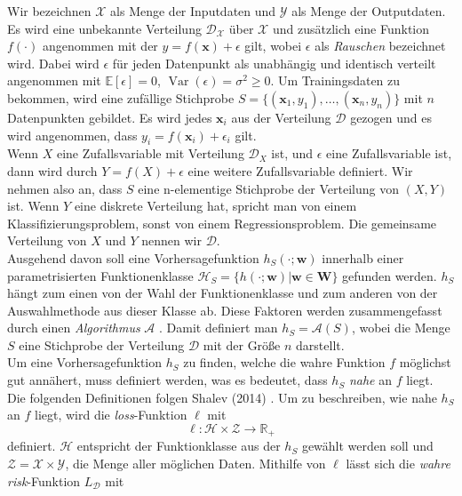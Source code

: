 Wir bezeichnen $\mathcal{X}$ als Menge der Inputdaten und $\mathcal{Y}$ als Menge der Outputdaten. Es wird eine unbekannte Verteilung $\mathcal{D_X}$ \"uber 
$\mathcal{X}$ und zus\"atzlich eine Funktion $f(\cdot)$ angenommen mit der $y = f(\mathbf{x}) + \epsilon$ gilt, wobei $\epsilon$ als \textit{Rauschen} bezeichnet wird. 
Dabei wird $\epsilon$ f\"ur jeden Datenpunkt als unabh\"angig und identisch verteilt angenommen mit
$\mathbb{E}[\epsilon] = 0$, $\operatorname{Var}(\epsilon) = \sigma^2 \geq 0$.
Um Trainingsdaten zu bekommen, wird eine zuf\"allige Stichprobe $S = \{(\mathbf{x}_1, y_1), \dots ,
(\mathbf{x}_n, y_n)\}$ mit $n$ Datenpunkten gebildet. Es wird jedes $\mathbf{x}_i$ aus der Verteilung $\mathcal{D}$ gezogen und es wird 
angenommen, dass $y_i = f(\mathbf{x}_i) + \epsilon_i $ gilt. \\


Wenn $X$ eine Zufallsvariable mit Verteilung $\mathcal{D}_X$ ist, und $\epsilon$ eine Zufallsvariable ist, dann wird durch 
$Y = f(X) + \epsilon$ eine weitere Zufallsvariable definiert. Wir nehmen also an, dass $S$ eine n-elementige Stichprobe der Verteilung
von $(X,Y)$ ist. Wenn $Y$ eine diskrete Verteilung hat, spricht man von einem Klassifizierungsproblem, sonst von einem Regressionsproblem.
Die gemeinsame Verteilung von $X$ und $Y$ nennen wir $\mathcal{D}$.\\

Ausgehend davon soll eine Vorhersagefunktion $h_S(\cdot;\mathbf{w})$ innerhalb einer parametrisierten Funktionenklasse $\mathcal{H}_S = \{ h(\cdot; \mathbf{w})
|\mathbf{w} \in \mathbf{W}\}$ gefunden werden. $h_S$ h\"angt zum einen von der Wahl der Funktionenklasse und zum anderen von der Auswahlmethode aus dieser Klasse ab. 
Diese Faktoren werden zusammengefasst durch einen \textit{Algorithmus} $\mathcal{A}$ \cite{shalev}. Damit definiert man $h_S = \mathcal{A}(S)$, wobei die Menge $S$ eine 
Stichprobe der Verteilung $\mathcal{D}$ mit der Gr\"o{\ss}e $n$ darstellt. \\


Um eine Vorhersagefunktion $h_S$ zu finden, welche die wahre Funktion $f$ m\"oglichst gut ann\"ahert, muss definiert werden, was es bedeutet, dass 
$h_S$ \textit{nahe} an $f$ liegt. Die folgenden Definitionen folgen Shalev (2014) \cite{shalev}. 
Um zu beschreiben, wie nahe $h_S$ an $f$ liegt, wird die \textit{loss}-Funktion $\ell$ mit
$$ \ell : \mathcal{H} \times \mathcal{Z} \to \mathbb{R}_+ $$
definiert. $\mathcal{H}$ entspricht der Funktionklasse aus der $h_S$ gew\"ahlt werden soll und $\mathcal{Z} = 
\mathcal{X} \times \mathcal{Y}$, die Menge aller m\"oglichen Daten. Mithilfe von $\ell$ l\"asst sich die \textit{wahre risk}-Funktion $L_{\mathcal{D}}$ mit

